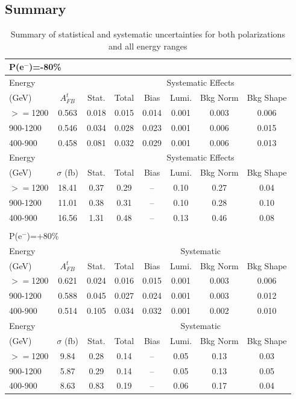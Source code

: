 \subsection{Summary}
\begin{table}
  \centering
  \begin{tabular}{l|c|c|c|c|c|c|c}
    \toprule
    \midrule
    \multicolumn{8}{l}{P(e$^-$)=-80\%} \\
    \midrule
    \midrule
   Energy &  &  &     \multicolumn{5}{c}{Systematic Effects} \\
    (GeV) & $A_{FB}^t$ & Stat. & Total & Bias & Lumi. & Bkg Norm & Bkg Shape\\
    \midrule
    $>=$1200   & 0.563 & 0.018 & 0.015 & 0.014 & 0.001 & 0.003 & 0.006\\
    \midrule
    900-1200   & 0.546 & 0.034 & 0.028 & 0.023 & 0.001 & 0.006 & 0.015\\
    \midrule
    400-900    & 0.458 & 0.081 & 0.032 & 0.029 & 0.001 & 0.006 & 0.013\\
    \midrule
    \midrule
    Energy &  &   &     \multicolumn{5}{c}{Systematic Effects} \\
    (GeV) & $\sigma$ (fb) & Stat. & Total & Bias & Lumi. & Bkg Norm & Bkg Shape\\
    \midrule
    $>=$1200   & 18.41 & 0.37 & 0.29 & -- & 0.10 & 0.27 & 0.04\\
    \midrule
    900-1200   & 11.01 & 0.38 & 0.31 & -- & 0.10 & 0.28 & 0.10\\
    \midrule
    400-900    & 16.56 & 1.31 & 0.48 & -- & 0.13 & 0.46 & 0.08\\
    \midrule
    \multicolumn{8}{c}{}\\
    \midrule
    \midrule
    \multicolumn{8}{l}{ P(e$^-$)=+80\%}\\
    \midrule
    \midrule
   Energy &  &   &     \multicolumn{5}{c}{Systematic} \\
    (GeV) & $A_{FB}^t$ & Stat. & Total & Bias & Lumi. & Bkg Norm & Bkg Shape\\
    \midrule
    $>=$1200   & 0.621 & 0.024 & 0.016 & 0.015 & 0.001 & 0.003 & 0.006\\
    \midrule
    900-1200   & 0.588 & 0.045 & 0.027 & 0.024 & 0.001 & 0.003 & 0.012\\
    \midrule
    400-900    & 0.514 & 0.105 & 0.034 & 0.032 & 0.001 & 0.002 & 0.010\\
    \midrule
    \midrule
    Energy &  &   &     \multicolumn{5}{c}{Systematic} \\
    (GeV) & $\sigma$ (fb) & Stat. & Total & Bias & Lumi. & Bkg Norm & Bkg Shape\\
    \midrule
    $>=$1200   & 9.84 & 0.28 & 0.14 & -- & 0.05 & 0.13 & 0.03\\
    \midrule
    900-1200   & 5.87 & 0.29 & 0.14 & -- & 0.05 & 0.13 & 0.05\\
    \midrule
    400-900    & 8.63 & 0.83 & 0.19 & -- & 0.06 & 0.17 & 0.04\\
    \bottomrule
  \end{tabular}
  \caption{Summary of statistical and systematic uncertainties for both polarizations and all energy ranges}
  \label{finaltable}
\end{table}

